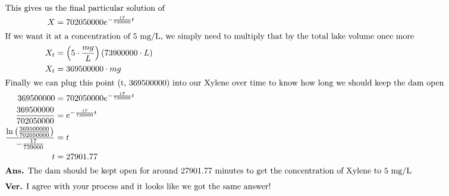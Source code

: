 \documentclass[12pt]{article}
\begin{document}
\begin{align}
  \intertext{This gives us the final particular solution of }
  X                                                                                        & =702050000e^{-\frac{17}{739000}t}                                                                                                                                         \\
  \intertext{If we want it at a concentration of 5 mg/L, we simply need to multiply that by the total lake volume once more}
  X_{t}                                                                                    & =\left(5\cdot\frac{mg}{L}\right)\left(73900000\cdot L\right)                                                                                                              \\
  X_{t}                                                                                    & =369500000\cdot mg                                                                                                                                                        \\
  \intertext{Finally we can plug this point (t, 369500000) into our Xylene over time to know how long we should keep the dam open}
  369500000                                                                                & =702050000e^{-\frac{17}{739000}t}                                                                                                                                         \\
  \frac{369500000}{702050000}                                                              & =e^{-\frac{17}{739000}t}                                                                                                                                                  \\
  \frac{\ln\left(\frac{369500000}{702050000}\right)}{-\frac{17}{739000}}                   & =t                                                                                                                                                                        \\
  t                                                                                        & =27901.77                                                                                                                                                                 \\
  \intertext{\textbf{Ans.} The dam should be kept open for around 27901.77 minutes to get the concentration of Xylene to 5 mg/L}
  \intertext{\textbf{Ver.} I agree with your process and it looks like we got the same answer!}
\end{align}
\end{document}
